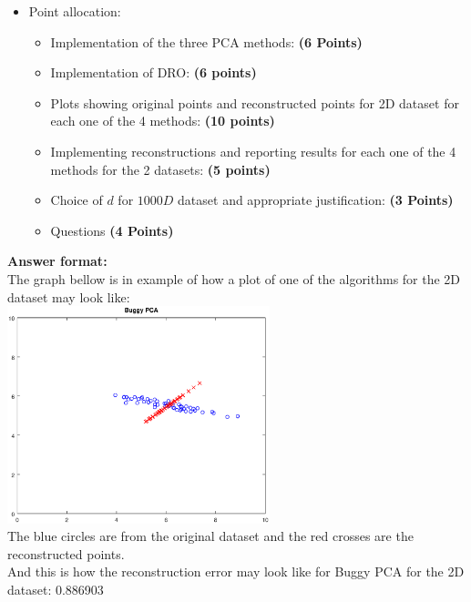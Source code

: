 \documentclass[a4paper]{article}
\newcounter{thm}
\theoremstyle{definition}
\begin{document}
\begin{itemize}
\begin{enumerate}
\end{enumerate}

\item Point allocation:
\begin{itemize}
\item Implementation of the three PCA methods: \textbf{(6 Points)}
\item Implementation of DRO: \textbf{(6 points)}
\item Plots showing original points and reconstructed points for 2D dataset for each one of the 4 methods: \textbf{(10 points)}
\item Implementing reconstructions and reporting results for each one of the 4 methods for the 2 datasets: \textbf{(5 points)}
\item Choice of $d$ for $1000D$ dataset and appropriate justification:
\textbf{(3 Points)}
\item Questions \textbf{(4 Points)}
\end{itemize}

\end{itemize}



\vspace{0.2in}

\textbf{Answer format:}  \\
The graph bellow is in example of how a plot of one of the algorithms for the 2D dataset may look like: \\
\includegraphics[width=3in]{buggy_pca} \hspace{0.4in}
\\

The blue circles are from the original dataset and the red crosses are the reconstructed points. \\

And this is how the reconstruction error may look like for Buggy PCA for the 2D dataset: 0.886903








\end{document}
